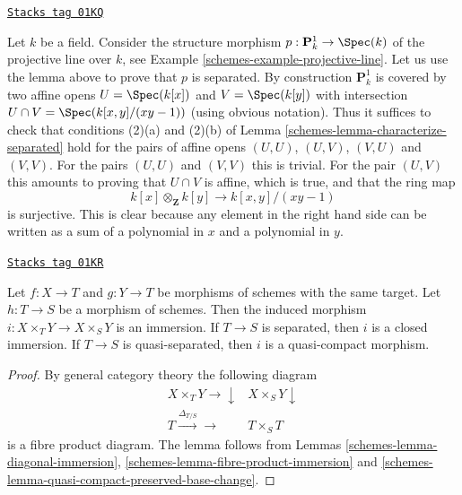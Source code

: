 \begin{example}
\label{schemes-example-projective-line-separated}
\href{https://stacks.math.columbia.edu/tag/01KQ}{\texttt{Stacks tag 01KQ}}

Let $k$ be a field. Consider the structure morphism
$p : \mathbf{P}^1_k \to \Spec(k)$ of the projective
line over $k$, see Example \ref{schemes-example-projective-line}.
Let us use the lemma above to prove that $p$
is separated. By construction $\mathbf{P}^1_k$ is covered by two
affine opens $U = \Spec(k[x])$ and $V = \Spec(k[y])$
with intersection $U \cap V = \Spec(k[x, y]/(xy - 1))$
(using obvious notation). Thus it suffices to check that
conditions (2)(a) and (2)(b) of Lemma \ref{schemes-lemma-characterize-separated}
hold for the pairs of affine opens $(U, U)$, $(U, V)$, $(V, U)$
and $(V, V)$. For the pairs $(U, U)$ and $(V, V)$ this is trivial.
For the pair $(U, V)$ this amounts to proving
that $U \cap V$ is affine, which is true, and that the ring map
$$
k[x] \otimes_{\mathbf{Z}} k[y] \longrightarrow k[x, y]/(xy - 1)
$$
is surjective. This is clear because any element in the
right hand side can be written as a sum of a polynomial
in $x$ and a polynomial in $y$.
\end{example}

\begin{lemma}
\label{schemes-lemma-fibre-product-after-map}
\href{https://stacks.math.columbia.edu/tag/01KR}{\texttt{Stacks tag 01KR}}

Let $f : X \to T$ and $g : Y \to T$ be morphisms of schemes
with the same target. Let $h : T \to S$ be a morphism of schemes.
Then the induced morphism $i : X \times_T Y \to X \times_S Y$ is
an immersion. If $T \to S$ is separated, then $i$ is a closed
immersion. If $T \to S$ is quasi-separated, then $i$ is a
quasi-compact morphism.
\end{lemma}

\begin{proof}

By general category theory the following diagram
$$
\begin{array}{cc}X \times_T Y \longrightarrow\downarrow & X \times_S Y \downarrow \\ T \overset{\Delta_{T/S}}{\longrightarrow}\longrightarrow & T \times_S T\end{array}
$$
is a fibre product diagram. The lemma follows
from Lemmas \ref{schemes-lemma-diagonal-immersion},
\ref{schemes-lemma-fibre-product-immersion} and
\ref{schemes-lemma-quasi-compact-preserved-base-change}.
\end{proof}

